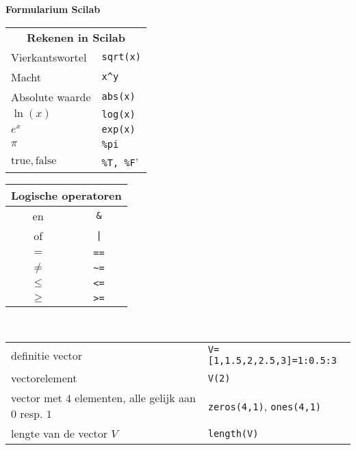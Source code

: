 \documentclass[10pt]{article}
\newcommand{\mysection}[1]{\vspace{1.em} \noindent {\bf {\large #1}}}
\newcommand{\mym}[1]{${\displaystyle #1}$}
\begin{document}
\clearpage

\noindent
{\bf {\huge Formularium Scilab}}

\vspace{0.5em}

\begin{multicols}{2}
\begin{center}
  \begin{tabular}{p{}l}
    \multicolumn{2}{c}{\large\bfseries Rekenen in Scilab} \\
    Vierkantswortel & \verb'sqrt(x)' \\
    Macht & \verb'x^y' \\ Absolute waarde & \verb'abs(x)' \\
    $\ln(x)$ & \verb'log(x)' \\
    \mym{e^x} &\verb'exp(x)' \\
    $\pi$ & \verb'%pi' \\
    $\mathrm{true}, \mathrm{false}$ & \verb'%T, %F'
  \end{tabular}
\end{center}
\begin{center}
  \begin{tabular}{|c|c|}
    \multicolumn{2}{c}{\large\bfseries Logische operatoren} \\
    \hline
    {\sc en} & \verb'&' \\
    \hline
    {\sc of} & \verb'|' \\
    \hline
    $=$ & \verb'==' \\
    \hline
    $\neq$ & \verb'~=' \\
    \hline
    $\leq$ & \verb'<=' \\
    \hline
    $\geq$ & \verb'>=' \\ 
    \hline
  \end{tabular}
\end{center}
\end{multicols}


\mysection{Vectoren}\\
\begin{tabular}{|p{7.3cm}|p{5.5cm}|}
  \hline
  definitie vector    &   \verb+V=[1,1.5,2,2.5,3]=1:0.5:3+ \\
  vectorelement       &   \verb+V(2)+\\
  vector met $4$ elementen, alle gelijk aan $0$ resp. $1$ & \verb+zeros(4,1)+, \verb+ones(4,1)+ \\
  lengte van de vector $V$ & \texttt{length(V)}\\
  \hline
\end{tabular}
\end{document}
